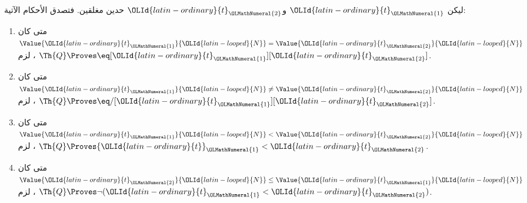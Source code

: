 \documentclass[../../../include/open-logic-section]{subfiles}
\begin{document}
\begin{lem}
ليكن ${\OLId{latin-ordinary}{t}}_{\OLMathNumeral{1}}$ و${\OLId{latin-ordinary}{t}}_{\OLMathNumeral{2}}$ حدين مغلقين. فتصدق الأحكام الآتية:
\begin{enumerate}
\item متى كان $\Value{{\OLId{latin-ordinary}{t}}_{\OLMathNumeral{1}}}{{\OLId{latin-looped}{N}}}=\Value{{\OLId{latin-ordinary}{t}}_{\OLMathNumeral{2}}}{{\OLId{latin-looped}{N}}}$،
    لزم $\Th{Q}\Proves\eq[{\OLId{latin-ordinary}{t}}_{\OLMathNumeral{1}}][{\OLId{latin-ordinary}{t}}_{\OLMathNumeral{2}}]$.
\item متى كان $\Value{{\OLId{latin-ordinary}{t}}_{\OLMathNumeral{1}}}{{\OLId{latin-looped}{N}}}\neq\Value{{\OLId{latin-ordinary}{t}}_{\OLMathNumeral{2}}}{{\OLId{latin-looped}{N}}}$،
    لزم $\Th{Q}\Proves\eq/[{\OLId{latin-ordinary}{t}}_{\OLMathNumeral{1}}][{\OLId{latin-ordinary}{t}}_{\OLMathNumeral{2}}]$.
\item متى كان $\Value{{\OLId{latin-ordinary}{t}}_{\OLMathNumeral{1}}}{{\OLId{latin-looped}{N}}}<\Value{{\OLId{latin-ordinary}{t}}_{\OLMathNumeral{2}}}{{\OLId{latin-looped}{N}}}$،
    لزم $\Th{Q}\Proves {\OLId{latin-ordinary}{t}}_{\OLMathNumeral{1}}<{\OLId{latin-ordinary}{t}}_{\OLMathNumeral{2}}$.
\item متى كان $\Value{{\OLId{latin-ordinary}{t}}_{\OLMathNumeral{2}}}{{\OLId{latin-looped}{N}}}\leq\Value{{\OLId{latin-ordinary}{t}}_{\OLMathNumeral{1}}}{{\OLId{latin-looped}{N}}}$،
    لزم $\Th{Q}\Proves\lnot({\OLId{latin-ordinary}{t}}_{\OLMathNumeral{1}}<{\OLId{latin-ordinary}{t}}_{\OLMathNumeral{2}})$.
\end{enumerate}
\end{lem}
\end{document}

